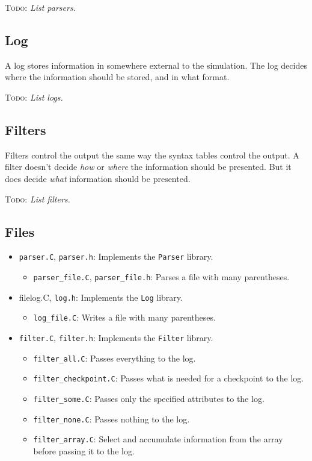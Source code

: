 \documentclass{article}
\newcommand{\code}[1]{\texttt{#1}}
\newcommand{\file}[1]{\texttt{#1}}
\newcommand{\todo}[1]{\textsc{Todo}: \textit{#1}}
\begin{document}
\todo{List parsers.}

\subsection{Log}

A log stores information in somewhere external to the simulation.  The
log decides where the information should be stored, and in what
format.

\todo{List logs.}

\subsection{Filters}

Filters control the output the same way the syntax tables control the
output.  A filter doesn't decide \emph{how} or \emph{where} the
information should be presented.  But it does decide \emph{what}
information should be presented.

\todo{List filters.}

\subsection{Files}

\begin{itemize}
\item \file{parser.C}, \file{parser.h}: Implements the \code{Parser}
  library.
  \begin{itemize}
  \item \file{parser\_file.C}, \file{parser\_file.h}:  Parses a file
    with many parentheses.
  \end{itemize}
\item file{log.C}, \file{log.h}: Implements the \code{Log} library.
  \begin{itemize}
  \item \file{log\_file.C}:  Writes a file with many parentheses.
  \end{itemize}
\item \file{filter.C}, \file{filter.h}: Implements the \code{Filter}
  library. 
  \begin{itemize}
  \item \file{filter\_all.C}: Passes everything to the log. 
  \item \file{filter\_checkpoint.C}: Passes what is needed for a
    checkpoint to the log.
  \item \file{filter\_some.C}: Passes only the specified attributes to
    the log.
  \item \file{filter\_none.C}: Passes nothing to the log.
  \item \file{filter\_array.C}: Select and accumulate information from
    the array before passing it to the log.
  \end{itemize}
\end{itemize}
\end{document}
